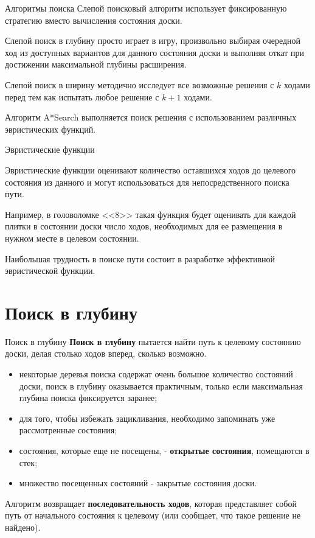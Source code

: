 \documentclass{beamer}
\begin{document}
\begin{frame}{Алгоритмы поиска}
Слепой поисковый алгоритм использует фиксированную стратегию вместо вычисления состояния доски. 
\begin{block}{Слепой поиск в глубину}
просто играет в игру, произвольно выбирая очередной ход из доступных вариантов для данного состояния доски и выполняя откат при достижении максимальной глубины расширения.
\end{block}
\begin{block}{Слепой поиск в ширину}
методично исследует все возможные решения с $k$ ходами перед тем
как испытать любое решение с $k+1$ ходами.
\end{block}
\begin{block}{Алгоритм A*Search}
выполняется поиск решения с использованием различных эвристических функций. 
\end{block}
\end{frame}

\begin{frame}{Эвристические функции}
\begin{block}{Эвристические функции }
оценивают количество оставшихся ходов до целевого состояния из данного и могут использоваться для непосредственного поиска пути. 
\end{block}
Например, в головоломке <<8>> такая функция будет оценивать для каждой плитки в состоянии доски число ходов, необходимых для ее размещения в нужном месте в целевом состоянии. 

Наибольшая трудность в поиске пути состоит в разработке эффективной эвристической функции. 
\end{frame}

\section{Поиск в глубину}
\begin{frame}{Поиск в глубину}
\textbf{Поиск в глубину} пытается найти путь к целевому состоянию доски, делая столько ходов вперед, сколько возможно. 
\begin{itemize}
\item некоторые деревья поиска содержат очень большое количество состояний доски, поиск в глубину оказывается практичным, только
если максимальная глубина поиска фиксируется заранее;
\item для того, чтобы избежать зацикливания, необходимо запоминать уже рассмотренные состояния;
\item состояния, которые еще не посещены, - \textbf{открытые состояния}, помещаются в стек;
\item множество посещенных состояний - закрытые состояния доски. 
\end{itemize}
Алгоритм возвращает \textbf{последовательность ходов}, которая представляет собой путь от начального состояния к целевому (или сообщает, что такое решение не найдено).
\end{frame}
\end{document}
